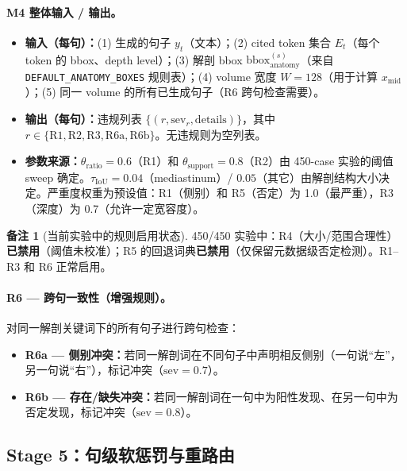 \documentclass[11pt,a4paper]{article}
\theoremstyle{definition}
\newtheorem{remark}{备注}[section]
\begin{document}
\paragraph{M4 整体输入 / 输出。}
\begin{itemize}[nosep]
    \item \textbf{输入（每句）：}(1) 生成的句子 $y_t$（文本）；(2) cited token 集合 $E_t$（每个 token 的 bbox、depth level）；(3) 解剖 bbox $\mathrm{bbox}_{\mathrm{anatomy}}^{(s)}$（来自 \texttt{DEFAULT\_ANATOMY\_BOXES} 规则表）；(4) volume 宽度 $W=128$（用于计算 $x_{\mathrm{mid}}$）；(5) 同一 volume 的所有已生成句子（R6 跨句检查需要）。
    \item \textbf{输出（每句）：}违规列表 $\{(r, \mathrm{sev}_r, \mathrm{details})\}$，其中 $r \in \{\mathrm{R1}, \mathrm{R2}, \mathrm{R3}, \mathrm{R6a}, \mathrm{R6b}\}$。无违规则为空列表。
    \item \textbf{参数来源：}$\theta_{\mathrm{ratio}} = 0.6$（R1）和 $\theta_{\mathrm{support}} = 0.8$（R2）由 450-case 实验的阈值 sweep 确定。$\tau_{\mathrm{IoU}} = 0.04$（mediastinum）/ $0.05$（其它）由解剖结构大小决定。严重度权重为预设值：R1（侧别）和 R5（否定）为 1.0（最严重），R3（深度）为 0.7（允许一定宽容度）。
\end{itemize}

\begin{remark}[当前实验中的规则启用状态]
450/450 实验中：R4（大小/范围合理性）\textbf{已禁用}（阈值未校准）；R5 的回退词典\textbf{已禁用}（仅保留元数据级否定检测）。R1--R3 和 R6 正常启用。
\end{remark}

\paragraph{R6 --- 跨句一致性（增强规则）。}
对同一解剖关键词下的所有句子进行跨句检查：
\begin{itemize}[nosep]
    \item \textbf{R6a --- 侧别冲突：}若同一解剖词在不同句子中声明相反侧别（一句说``左''，另一句说``右''），标记冲突（$\mathrm{sev}=0.7$）。
    \item \textbf{R6b --- 存在/缺失冲突：}若同一解剖词在一句中为阳性发现、在另一句中为否定发现，标记冲突（$\mathrm{sev}=0.8$）。
\end{itemize}

\subsection{Stage 5：句级软惩罚与重路由}
\end{document}
